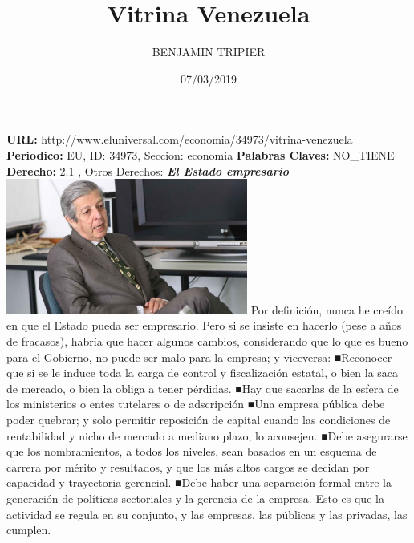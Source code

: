 \documentclass{article}%
\title{\textbf{Vitrina Venezuela}}%
\author{BENJAMIN TRIPIER}%
\date{07/03/2019}%
\begin{document}
%
\normalsize%
\maketitle%
\textbf{URL: }%
http://www.eluniversal.com/economia/34973/vitrina{-}venezuela\newline%
%
\textbf{Periodico: }%
EU, %
ID: %
34973, %
Seccion: %
economia\newline%
%
\textbf{Palabras Claves: }%
NO\_TIENE\newline%
%
\textbf{Derecho: }%
2.1%
, Otros Derechos: %
\newline%
%
\textbf{\textit{El Estado empresario}}%
\newline%
\newline%
%
\includegraphics[width=300px]{EU_34973.jpg}%
\newline%
%
Por definición, nunca he creído en que el Estado pueda ser empresario. Pero si se insiste en hacerlo (pese a años de fracasos), habría que hacer algunos cambios, considerando que lo que es bueno para el Gobierno, no puede ser malo para la empresa; y viceversa:%
\newline%
%
■Reconocer que si se le induce toda la carga de control y fiscalización estatal, o bien la saca de mercado, o bien la obliga a tener pérdidas.%
\newline%
%
■Hay que sacarlas de la esfera de los ministerios o entes tutelares o de adscripción%
\newline%
%
■Una empresa pública debe poder quebrar; y solo permitir reposición de capital cuando las condiciones de rentabilidad y nicho de mercado a mediano plazo, lo aconsejen.%
\newline%
%
■Debe asegurarse que los nombramientos, a todos los niveles, sean basados en un esquema de carrera por mérito y resultados, y que los más altos cargos se decidan por capacidad y trayectoria gerencial.%
\newline%
%
■Debe haber una separación formal entre la generación de políticas sectoriales y la gerencia de la empresa. Esto es que la actividad se regula en su conjunto, y las empresas, las públicas y las privadas, las cumplen.%
\end{document}
